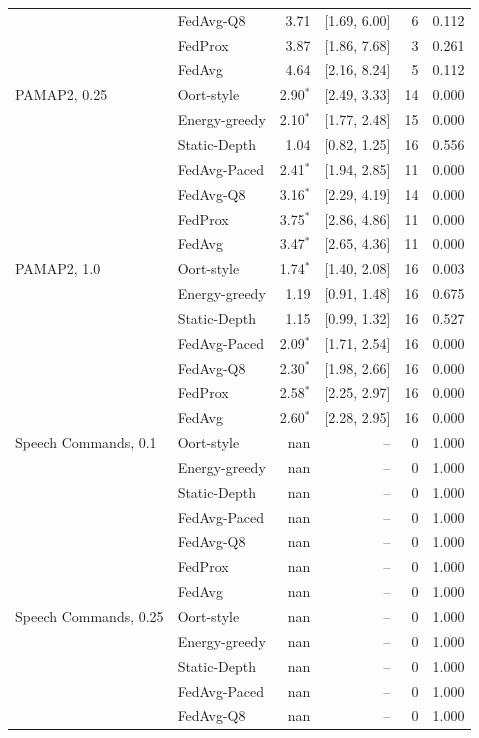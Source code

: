 \begin{tabular}{@{}llrrrr@{}}
 & FedAvg-Q8 & 3.71 & [1.69, 6.00] & 6 & 0.112\\
 & FedProx & 3.87 & [1.86, 7.68] & 3 & 0.261\\
 & FedAvg & 4.64 & [2.16, 8.24] & 5 & 0.112\\
\midrule
PAMAP2, 0.25 & Oort-style & 2.90$^{*}$ & [2.49, 3.33] & 14 & 0.000\\
 & Energy-greedy & 2.10$^{*}$ & [1.77, 2.48] & 15 & 0.000\\
 & Static-Depth & 1.04 & [0.82, 1.25] & 16 & 0.556\\
 & FedAvg-Paced & 2.41$^{*}$ & [1.94, 2.85] & 11 & 0.000\\
 & FedAvg-Q8 & 3.16$^{*}$ & [2.29, 4.19] & 14 & 0.000\\
 & FedProx & 3.75$^{*}$ & [2.86, 4.86] & 11 & 0.000\\
 & FedAvg & 3.47$^{*}$ & [2.65, 4.36] & 11 & 0.000\\
\midrule
PAMAP2, 1.0 & Oort-style & 1.74$^{*}$ & [1.40, 2.08] & 16 & 0.003\\
 & Energy-greedy & 1.19 & [0.91, 1.48] & 16 & 0.675\\
 & Static-Depth & 1.15 & [0.99, 1.32] & 16 & 0.527\\
 & FedAvg-Paced & 2.09$^{*}$ & [1.71, 2.54] & 16 & 0.000\\
 & FedAvg-Q8 & 2.30$^{*}$ & [1.98, 2.66] & 16 & 0.000\\
 & FedProx & 2.58$^{*}$ & [2.25, 2.97] & 16 & 0.000\\
 & FedAvg & 2.60$^{*}$ & [2.28, 2.95] & 16 & 0.000\\
\midrule
Speech Commands, 0.1 & Oort-style & nan & -- & 0 & 1.000\\
 & Energy-greedy & nan & -- & 0 & 1.000\\
 & Static-Depth & nan & -- & 0 & 1.000\\
 & FedAvg-Paced & nan & -- & 0 & 1.000\\
 & FedAvg-Q8 & nan & -- & 0 & 1.000\\
 & FedProx & nan & -- & 0 & 1.000\\
 & FedAvg & nan & -- & 0 & 1.000\\
\midrule
Speech Commands, 0.25 & Oort-style & nan & -- & 0 & 1.000\\
 & Energy-greedy & nan & -- & 0 & 1.000\\
 & Static-Depth & nan & -- & 0 & 1.000\\
 & FedAvg-Paced & nan & -- & 0 & 1.000\\
 & FedAvg-Q8 & nan & -- & 0 & 1.000\\

\end{tabular}
